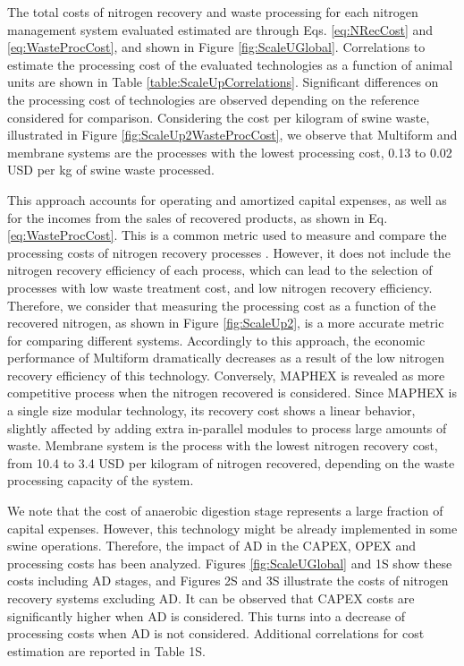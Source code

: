\begin{refsection}[referencesCh6]
The total costs of nitrogen recovery and waste processing for each nitrogen management system evaluated estimated are through Eqs. \ref{eq:NRecCost} and \ref{eq:WasteProcCost}, and shown in Figure \ref{fig:ScaleUGlobal}.
Correlations to estimate the processing cost of the evaluated technologies as a function of animal units are shown in Table \ref{table:ScaleUpCorrelations}. Significant differences on the processing cost of technologies are observed depending on the reference considered for comparison. Considering the cost per kilogram of swine waste, illustrated in Figure \ref{fig:ScaleUp2WasteProcCost}, we observe that Multiform and membrane systems are the processes with the lowest processing cost, 0.13 to 0.02 USD per kg of swine waste processed. 

This approach accounts for operating and amortized capital expenses, as well as for the incomes from the sales of recovered products, as shown in Eq. \ref{eq:WasteProcCost}.
This is a common metric used to measure and compare the processing costs of nitrogen recovery processes \citep{de2019resource, bolzonella2018nutrients}.
However, it does not include the nitrogen recovery efficiency of each process, which can lead to the selection of processes with low waste treatment cost, and low nitrogen recovery efficiency. Therefore, we consider that measuring the processing cost as a function of the recovered nitrogen, as shown in Figure \ref{fig:ScaleUp2}, is a more accurate metric for comparing different systems. Accordingly to this approach, the economic performance of Multiform dramatically decreases as a result of the low nitrogen recovery efficiency of this technology. Conversely, MAPHEX is revealed as more competitive process when the nitrogen recovered is considered. Since MAPHEX is a single size modular technology, its recovery cost shows a linear behavior, slightly affected by adding extra in-parallel modules to process large amounts of waste. Membrane system is the process with the lowest nitrogen recovery cost, from 10.4 to 3.4 USD per kilogram of nitrogen recovered, depending on the waste processing capacity of the system.

We note that the cost of anaerobic digestion stage represents a large fraction of capital expenses. However, this technology might be already implemented in some swine operations. Therefore, the impact of AD in the CAPEX, OPEX and processing costs has been analyzed. Figures \ref{fig:ScaleUGlobal} and
1S
show these costs including AD stages, and
Figures 2S and 3S
illustrate the costs of nitrogen recovery systems excluding AD. It can be observed that CAPEX costs are significantly higher when AD is considered. This turns into a decrease of processing costs when AD is not considered. Additional correlations for cost estimation
are reported in
Table 1S.


\end{refsection}
